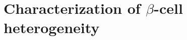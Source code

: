 
\section[Characterization of $\beta$-cell heterogeneity]{Characterization of $\beta$-cell heterogeneity}
\label{sec:chp3_betaclustering}


